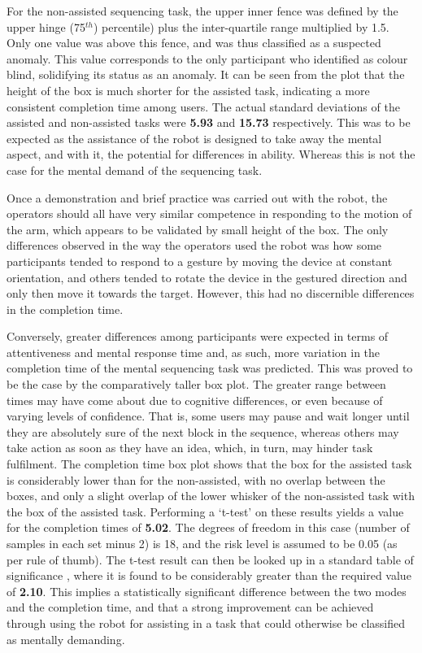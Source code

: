 \documentclass[11pt]{article}
\begin{document}
For the non-assisted sequencing task, the upper inner fence was defined by the upper hinge (75$^{th}$) percentile) plus the inter-quartile range multiplied by 1.5. Only one value was above this fence, and was thus classified as a suspected anomaly. This value corresponds to the only participant who identified as colour blind, solidifying its status as an anomaly. It can be seen from the plot that the height of the box is much shorter for the assisted task, indicating a more consistent completion time among users. The actual standard deviations of the assisted and non-assisted tasks were \textbf{5.93} and \textbf{15.73} respectively. This was to be expected as the assistance of the robot is designed to take away the mental aspect, and with it, the potential for differences in ability. Whereas this is not the case for the mental demand of the sequencing task. 

Once a demonstration and brief practice was carried out with the robot, the operators should all have very similar competence in responding to the motion of the arm, which appears to be validated by small height of the box. The only differences observed in the way the operators used the robot was how some participants tended to respond to a gesture by moving the device at constant orientation, and others tended to rotate the device in the gestured direction and only then move it towards the target. However, this had no discernible differences in the completion time. 

Conversely, greater differences among participants were expected in terms of attentiveness and mental response time and, as such, more variation in the completion time of the mental sequencing task was predicted. This was proved to be the case by the comparatively taller box plot. The greater range between times may have come about due to cognitive differences, or even because of varying levels of confidence. That is, some users may pause and wait longer until they are absolutely sure of the next block in the sequence, whereas others may take action as soon as they have an idea, which, in turn, may hinder task fulfilment. The completion time box plot shows that the box for the assisted task is considerably lower than for the non-assisted, with no overlap between the boxes, and only a slight overlap of the lower whisker of the non-assisted task with the box of the assisted task. Performing a `t-test' on these results yields a value for the completion times of \textbf{5.02}. The degrees of freedom in this case (number of samples in each set minus 2) is 18, and the risk level is assumed to be 0.05 (as per rule of thumb). The t-test result can then be looked up in a standard table of significance \cite{ttable}, where it is found to be considerably greater than the required value of \textbf{2.10}. This implies a statistically significant difference between the two modes and the completion time, and that a strong improvement can be achieved through using the robot for assisting in a task that could otherwise be classified as mentally demanding. 
\end{document}
